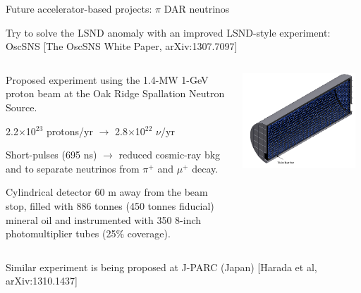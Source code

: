 \begin{frame}[t]{Future accelerator-based projects: $\pi$ DAR neutrinos}

Try to solve the LSND anomaly with an improved LSND-style experiment: OscSNS
{\color{blue}[The OscSNS White Paper, arXiv:1307.7097]}
\begin{columns}
  \begin{column}{0.50\textwidth}
     \begin{itemize}
     {\scriptsize
       \item Proposed experiment using the 1.4-MW 1-GeV proton beam at
             the Oak Ridge Spallation Neutron Source.
       \item 2.2$\times$10$^{23}$ protons/yr $\rightarrow$
             2.8$\times$10$^{22}$ $\nu$/yr
       \item Short-pulses (695 ns) $\rightarrow$ reduced cosmic-ray bkg and to separate
             neutrinos from $\pi^{+}$ and $\mu^{+}$ decay.
       \item Cylindrical detector 60 m away from the beam stop,
             filled with 886 tonnes (450 tonnes fiducial)
             mineral oil and instrumented with 350 8-inch photomultiplier tubes (25\% coverage).
     }
     \end{itemize}
  \end{column}
  \begin{column}{0.50\textwidth}
    \includegraphics[width=0.95\textwidth]{./images/beyond3nu/future/oscsns_detector.png}
  \end{column}
\end{columns}
\begin{center}
{\scriptsize
 Similar experiment is being proposed at J-PARC (Japan)
 {\color{blue}[Harada et al, arXiv:1310.1437]}
}
\end{center}
\end{frame}


